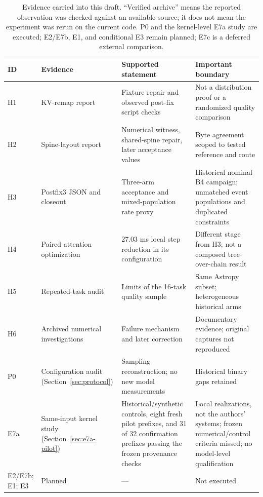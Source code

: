 \documentclass[conference]{IEEEtran}
\begin{document}
\begin{table}[t]
\caption{Evidence carried into this draft. ``Verified archive'' means the reported observation was checked against an available source; it does not mean the experiment was rerun on the current code. P0 and the kernel-level E7a study are executed; E2/E7b, E1, and conditional E3 remain planned; E7c is a deferred external comparison.}
\label{tab:evidence}
\centering\footnotesize
\begin{tabularx}{\textwidth}{@{}p{}p{}Yp{0.25\textwidth}@{}}
\toprule
ID & Evidence & Supported statement & Important boundary \\
\midrule
H1 & KV-remap report~\cite{lumo2026stateless} & Fixture repair and observed post-fix script checks & Not a distribution proof or a randomized quality comparison \\
H2 & Spine-layout report~\cite{lumo2026spine} & Numerical witness, shared-spine repair, later acceptance values & Byte agreement scoped to tested reference and route \\
H3 & Postfix3 JSON and closeout~\cite{lumo2026archive} & Three-arm acceptance and mixed-population rate proxy & Historical nominal-B4 campaign; unmatched event populations and duplicated constraints \\
H4 & Paired attention optimization~\cite{lumo2026paired} & 27.03 ms local step reduction in its configuration & Different stage from H3; not a composed tree-over-chain result \\
H5 & Repeated-task audit~\cite{lumo2026archive} & Limits of the 16-task quality sample & Same Astropy subset; heterogeneous historical arms \\
H6 & Archived numerical investigations & Failure mechanism and later correction & Documentary evidence; original captures not reproduced \\
P0 & Configuration audit (Section~\ref{sec:protocol}) & Sampling reconstruction; no new model measurements & Historical binary gaps retained \\
E7a & Same-input kernel study (Section~\ref{sec:e7a-pilot}) & Historical/synthetic controls, eight fresh pilot prefixes, and 31 of 32 confirmation prefixes passing the frozen provenance checks & Local realizations, not the authors' systems; frozen numerical/control criteria missed; no model-level qualification \\
E2/E7b; E1; E3 & Planned & --- & Not executed \\
\bottomrule
\end{tabularx}
\end{table}
\end{document}
